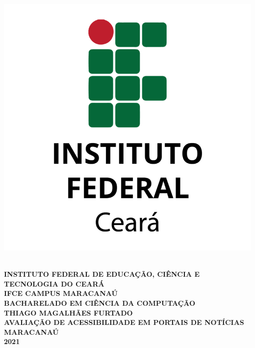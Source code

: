 \documentclass[a4paper]{article}
\begin{document}
\thispagestyle{empty}

\begin{titlepage}
	\vfill
	\begin{center}
		\onehalfspacing
		\parbox{6cm}{\includegraphics[scale=0.2]{logo.png}}\\
		\begingroup
		\fontsize{12pt}{0pt}\selectfont
		{\large \textbf{INSTITUTO FEDERAL DE EDUCAÇÃO, CIÊNCIA E TECNOLOGIA DO CEARÁ}}\\[0.2cm]
		\fontsize{12pt}{0pt}\selectfont
		{\large \textbf{IFCE CAMPUS MARACANAÚ}}\\[0.2cm]
		\fontsize{12pt}{0pt}\selectfont	
		{\large \textbf{BACHARELADO EM CIÊNCIA DA COMPUTAÇÃO}}\\[3.5cm]
		\fontsize{12pt}{0pt}\selectfont
		{\large \textbf{THIAGO MAGALHÃES FURTADO}}\\[3.5cm]
		\fontsize{12pt}{0pt}\selectfont
		{\large \textbf{AVALIAÇÃO DE ACESSIBILIDADE EM PORTAIS DE NOTÍCIAS}}\\[3.5cm]
		\fontsize{12pt}{0pt}\selectfont
		{\large \textbf{MARACANAÚ}}\\[0.2cm]
		\fontsize{12pt}{0pt}\selectfont
		{\large \textbf{2021}}
		\endgroup
	\end{center}
\end{titlepage}
\end{document}
